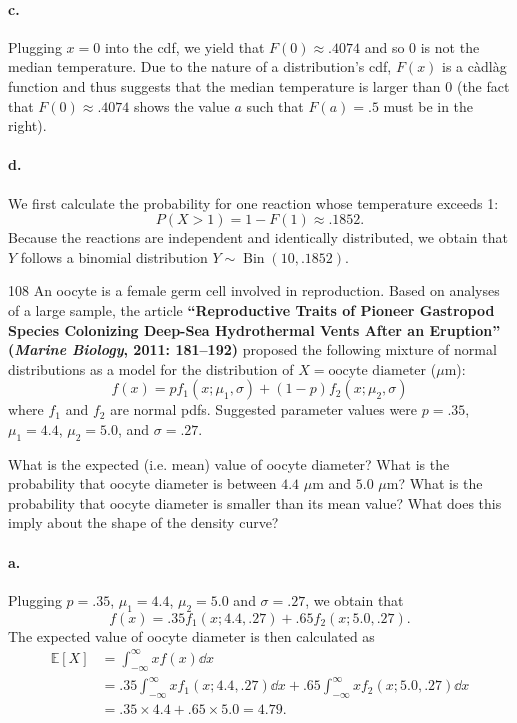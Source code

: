 \documentclass{exam}
\DeclareMathOperator{\Bin}{Bin}
\begin{document}
\paragraph{c.} Plugging $x = 0$ into the cdf, we yield that $F(0) \approx .4074$ and so $0$ is not the median temperature. Due to the nature of a distribution's cdf, $F(x)$ is a càdlàg function and thus suggests that the median temperature is larger than $0$ (the fact that $F(0) \approx .4074$ shows the value $a$ such that $F(a) = .5$ must be in the right).

\paragraph{d.} We first calculate the probability for one reaction whose temperature exceeds 1:
\[
	P(X > 1) = 1 - F(1) \approx .1852.
\]
Because the reactions are independent and identically distributed, we obtain that $Y$ follows a binomial distribution $Y \sim \Bin(10, .1852)$.

\begin{problem}{108}
	An oocyte is a female germ cell involved in reproduction. Based on analyses of a large sample, the article \textbf{``Reproductive Traits of Pioneer Gastropod Species Colonizing Deep-Sea Hydrothermal Vents After an Eruption'' (\textit{Marine Biology}, 2011: 181--192)} proposed the following mixture of normal distributions as a model for the distribution of $X = \text{oocyte diameter}$ ($\mu$m):
	\[
		f(x) = pf_1(x; \mu_1, \sigma) + (1 - p)f_2(x; \mu_2, \sigma)
	\]
	where $f_1$ and $f_2$ are normal pdfs. Suggested parameter values were $p = .35$, $\mu_1 = 4.4$, $\mu_2 = 5.0$, and $\sigma = .27$.
	\begin{tasks}[label=\textbf{\alph*.}]
		\task What is the expected (i.e. mean) value of oocyte diameter?
		\task What is the probability that oocyte diameter is between $4.4$ $\mu$m and $5.0$ $\mu$m?
		\task What is the probability that oocyte diameter is smaller than its mean value? What does this imply about the shape of the density curve?
	\end{tasks}
\end{problem}

\paragraph{a.} Plugging $p = .35$, $\mu_1 = 4.4$, $\mu_2 = 5.0$ and $\sigma = .27$, we obtain that \[
	f(x) = .35f_1(x; 4.4, .27) + .65f_2(x; 5.0, .27).
\]
The expected value of oocyte diameter is then calculated as
\begin{align*}
	\mathbb E[X] &= \int_{-\infty}^{\infty} xf(x)\dd x \\
	&= .35\int_{-\infty}^{\infty} xf_1(x; 4.4, .27)\dd x + .65\int_{-\infty}^{\infty} xf_2(x; 5.0, .27)\dd x \\
	&= .35 \times 4.4 + .65 \times 5.0 = 4.79.
\end{align*}
\end{document}

